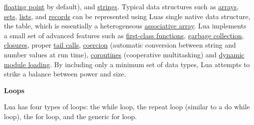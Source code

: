 \documentclass[a4paper]{article}
\begin{document}
{\href{http://en.wikipedia.org/wiki/Floating_point}{floating point} by
default), and
\href{http://en.wikipedia.org/wiki/String_(computer_science)}{strings}.
Typical data structures such as
\href{http://en.wikipedia.org/wiki/Array_data_structure}{arrays},
\href{http://en.wikipedia.org/wiki/Set_(computer_science)}{sets},
\href{http://en.wikipedia.org/wiki/List_(computing)}{lists}, and
\href{http://en.wikipedia.org/wiki/Record_(computer_science)}{records}
can be represented using Lua{\textquotesingle}s single native data
structure, the table, which is essentially a heterogeneous
\href{http://en.wikipedia.org/wiki/Associative_array}{associative
array}. Lua implements a small set of advanced features such as
\href{http://en.wikipedia.org/wiki/First-class_function}{first-class
functions},
\href{http://en.wikipedia.org/wiki/Garbage_collection_(computer_science)}{garbage
collection},
\href{http://en.wikipedia.org/wiki/Closure_(computer_science)}{closures},
proper \href{http://en.wikipedia.org/wiki/Tail_recursion}{tail calls},
\href{http://en.wikipedia.org/wiki/Type_conversion}{coercion}
(automatic conversion between string and number values at run time),
\href{http://en.wikipedia.org/wiki/Coroutine}{coroutines} (cooperative
multitasking) and
\href{http://en.wikipedia.org/wiki/Dynamic_loading}{dynamic module
loading}. By including only a minimum set of data types, Lua attempts
to strike a balance between power and size.}

{\bfseries
Loops}

{
Lua has four types of loops: the while loop, the repeat loop (similar to
a do while loop), the for loop, and the generic for loop.}
\end{document}
